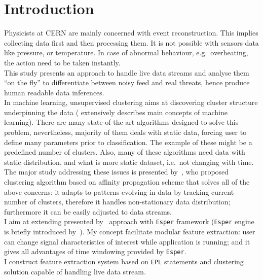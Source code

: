 \documentclass[11pt, letterpaper]{article}            %
\newcommand{\footrulecolor}[1]{\patchcmd{\footrule}{\hrule}{\color{#1}\hrule}{}{}} %
\begin{document}
\fancyfoot{} %
\renewcommand{\footrulewidth}{0.4pt} %
\footrulecolor{linec}

\section{Introduction}
Physicists at CERN are mainly concerned with event reconstruction. This implies collecting data first and then processing them. It is not possible with sensors data like pressure, or temperature. In case of abnormal behaviour, e.g.\ overheating, the action need to be taken instantly.\\
This study presents an approach to handle live data streams and analyse them ``on the fly'' to differentiate between noisy feed and real threats, hence produce human readable data inferences.\\

In machine learning, unsupervised clustering aims at discovering cluster structure underpinning the data (\citep{Flach:2012:MLA:2490546} extensively describes main concepts of machine learning). There are many state-of-the-art algorithms designed to solve this problem, nevertheless, majority of them deals with static data, forcing user to define many parameters prior to classification. The example of these might be a predefined number of clusters. Also, many of these algorithms need data with static distribution, and what is more static dataset, i.e.\ not changing with time.\\
The major study addressing these issues is presented by~\citep{zhang2013data}, who proposed clustering algorithm based on affinity propagation scheme that solves all of the above concerns: it adapts to patterns evolving in data by tracking current number of clusters, therefore it handles non-stationary data distribution; furthermore it can be easily adjusted to data streams.\\

I aim at extending presented by~\citep{zhang2013data} approach with \texttt{Esper} framework (\texttt{Esper} engine is briefly introduced by~\citep{Marinescu2006}). My concept facilitate modular feature extraction: user can change signal characteristics of interest while application is running; and it gives all advantages of time windowing provided by \texttt{Esper}.\\
I construct feature extraction system based on \texttt{EPL} statements and clustering solution capable of handling live data stream.\\
\end{document}
